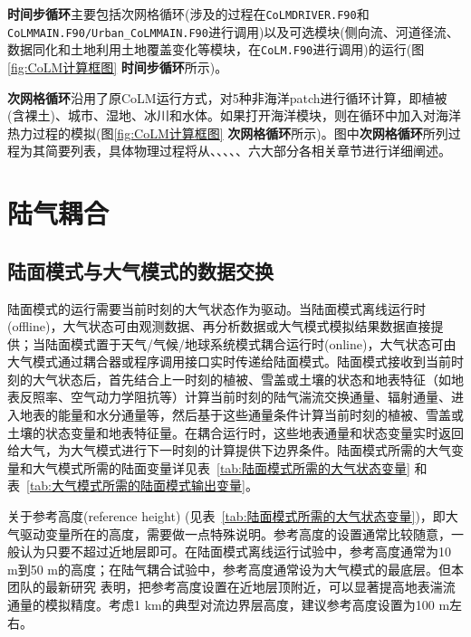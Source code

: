\textbf{时间步循环}主要包括次网格循环(涉及的过程在\texttt{CoLMDRIVER.F90}和\texttt{CoLMMAIN.F90\allowbreak /Urban\allowbreak \_CoLMMAIN.F90}进行调用)以及可选模块(侧向流、河道径流、数据同化和土地利用土地覆盖变化等模块，在\texttt{CoLM.F90}进行调用)的运行(图\ref{fig:CoLM计算框图} \textbf{时间步循环}所示)。

\textbf{次网格循环}沿用了原CoLM运行方式，对5种非海洋patch进行循环计算，即植被(含裸土)、城市、湿地、冰川和水体。如果打开海洋模块，则在循环中加入对海洋热力过程的模拟(图\ref{fig:CoLM计算框图} \textbf{次网格循环}所示)。图中\textbf{次网格循环}所列过程为其简要列表，具体物理过程将从、、、、、六大部分各相关章节进行详细阐述。

\section{陆气耦合}\label{陆气耦合}
\subsection{陆面模式与大气模式的数据交换}
陆面模式的运行需要当前时刻的大气状态作为驱动。当陆面模式离线运行时(offline)，大气状态可由观测数据、再分析数据或大气模式模拟结果数据直接提供；当陆面模式置于天气/气候/地球系统模式耦合运行时(online)，大气状态可由大气模式通过耦合器或程序调用接口实时传递给陆面模式。陆面模式接收到当前时刻的大气状态后，首先结合上一时刻的植被、雪盖或土壤的状态和地表特征（如地表反照率、空气动力学阻抗等）计算当前时刻的陆气湍流交换通量、辐射通量、进入地表的能量和水分通量等，然后基于这些通量条件计算当前时刻的植被、雪盖或土壤的状态变量和地表特征量。在耦合运行时，这些地表通量和状态变量实时返回给大气，为大气模式进行下一时刻的计算提供下边界条件。陆面模式所需的大气变量和大气模式所需的陆面变量详见表~\ref{tab:陆面模式所需的大气状态变量} 和表~\ref{tab:大气模式所需的陆面模式输出变量}。

关于参考高度(reference height) (见表~\ref{tab:陆面模式所需的大气状态变量})，即大气驱动变量所在的高度，需要做一点特殊说明。参考高度的设置通常比较随意，一般认为只要不超过近地层即可。在陆面模式离线运行试验中，参考高度通常为10 m到50 m的高度；在陆气耦合试验中，参考高度通常设为大气模式的最底层。但本团队的最新研究\citep{liu2023referenceheight} 表明，把参考高度设置在近地层顶附近，可以显著提高地表湍流通量的模拟精度。考虑1 km的典型对流边界层高度，建议参考高度设置为100 m左右。

